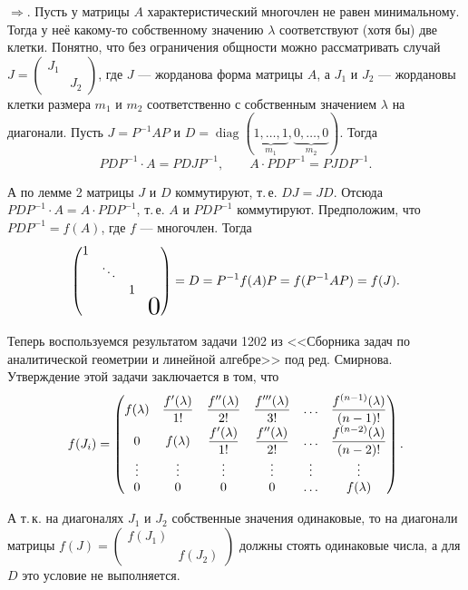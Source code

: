 \begin{solution}
    $\Rightarrow$. Пусть у матрицы $A$ характеристический многочлен не равен минимальному. Тогда у неё какому-то собственному значению $\lambda$ соответствуют (хотя бы) две клетки. Понятно, что без ограничения общности можно рассматривать случай
    $
    J =
    \begin{pmatrix}
        J_1 & \\
         & J_2
    \end{pmatrix}
    $, где $J$ --- жорданова форма матрицы $A$, а $J_1$ и $J_2$ --- жордановы клетки размера $m_1$ и $m_2$ соответственно с собственным значением $\lambda$ на диагонали. Пусть $J = P^{-1}AP$ и $D = \operatorname{diag}(\underbrace{1, \ldots, 1}_{m_1}, \underbrace{0, \ldots, 0}_{m_2})$. Тогда
    \[
        PDP^{-1} \cdot A = PDJP^{-1},\qquad A \cdot PDP^{-1} = PJDP^{-1}.
    \]

    А по лемме 2 матрицы $J$ и $D$ коммутируют, т.\,е. $DJ = JD$. Отсюда $PDP^{-1} \cdot A = A \cdot PDP^{-1}$, т.\,е. $A$ и $PDP^{-1}$ коммутируют. Предположим, что $PDP^{-1} = f(A)$, где $f$ --- многочлен. Тогда
    \[
        \begin{pmatrix}
            1 &  &  &  \\
             & \ddots &  & \\
             & & 1 & \\
             & & & \bigzero\\
        \end{pmatrix} =
        D = P^{-1}f(A)P = f(P^{-1}AP) = f(J).
    \]

    Теперь воспользуемся результатом задачи 1202 из <<Сборника задач по аналитической геометрии и линейной алгебре>> под ред. Смирнова. Утверждение этой задачи заключается в том, что
    \[
        f(J_i) =
        \begin{pmatrix}
            \displaystyle f(\lambda) & \displaystyle\frac{f^\prime(\lambda)}{1!} & \displaystyle\frac{f^{\prime\prime}(\lambda)}{2!} & \displaystyle\frac{f^{\prime\prime\prime}(\lambda)}{3!} & \ldots & \displaystyle\frac{f^{(n - 1)}(\lambda)}{(n - 1)!}\\
            0 & \displaystyle f(\lambda) & \displaystyle\frac{f^\prime(\lambda)}{1!} & \displaystyle\frac{f^{\prime\prime}(\lambda)}{2!} & \ldots & \displaystyle\frac{f^{(n - 2)}(\lambda)}{(n - 2)!}\\
            \vdots & \vdots & \vdots & \vdots & \vdots & \vdots\\
            0 & 0 & 0 & 0 & \ldots & f(\lambda)
        \end{pmatrix}.
    \]

    А т.\,к. на диагоналях $J_1$ и $J_2$ собственные значения одинаковые, то на диагонали матрицы
    $
    f(J) =
    \begin{pmatrix}
        f(J_1) & \\
         & f(J_2)
    \end{pmatrix}
    $ должны стоять одинаковые числа, а для $D$ это условие не выполняется.
\end{solution}

